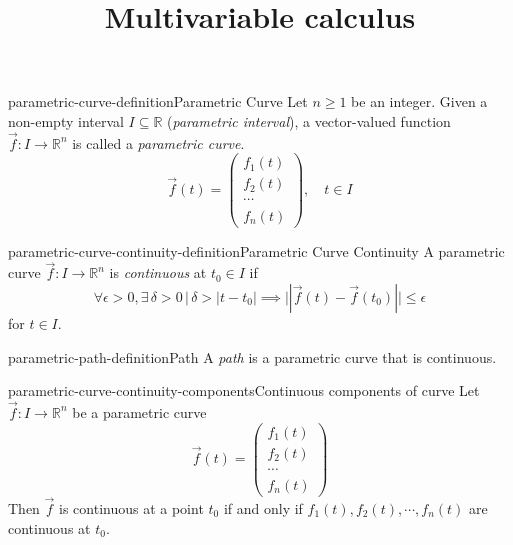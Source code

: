 \documentclass[preview]{standalone}
\begin{document}
\title{Multivariable calculus}
\genpage

\begin{snippetdefinition}{parametric-curve-definition}{Parametric Curve}
    Let \(n \geq 1\) be an integer.
    Given a non-empty interval \(I \subseteq \mathbb{R}\)
    (\textit{parametric interval}), a vector-valued function \(\vec{f}: I\to{\mathbb{R}}^n\)
    is called a \textit{parametric curve}.
    \[
        \vec{f}(t) = \begin{pmatrix}
                f_1(t) \\
                f_2(t) \\
                \cdots \\
                f_n(t)
        \end{pmatrix}, \quad t \in I
    \]
\end{snippetdefinition}

\begin{snippetdefinition}{parametric-curve-continuity-definition}{Parametric Curve Continuity}
    A parametric curve \(\vec{f}: I \to {\mathbb{R}}^n\)
    is \textit{continuous} at \(t_0 \in I\)
    if
    \[
        \forall \epsilon > 0, 
        \exists \, \delta > 0 \,|\, \delta > |t-t_0|
        \implies ||\vec{f}(t) - \vec{f}(t_0)|| \leq \epsilon
    \]
    for \(t \in I\).
\end{snippetdefinition}

\begin{snippetdefinition}{parametric-path-definition}{Path}
    A \textit{path} is a parametric curve
    that is continuous.
\end{snippetdefinition}

\begin{snippetproposition}{parametric-curve-continuity-components}{Continuous components of curve}
    Let \(\vec{f}: I \to {\mathbb{R}}^n\) be a parametric curve
    \[
        \vec{f}(t) = \begin{pmatrix}
                f_1(t) \\
                f_2(t) \\
                \cdots \\
                f_n(t)
        \end{pmatrix}
    \]
    Then \(\vec{f}\) is continuous at a point \(t_0\) if and only if
    \(f_1(t), f_2(t), \cdots, f_n(t)\) are continuous at \(t_0\).
\end{snippetproposition}
\end{document}

